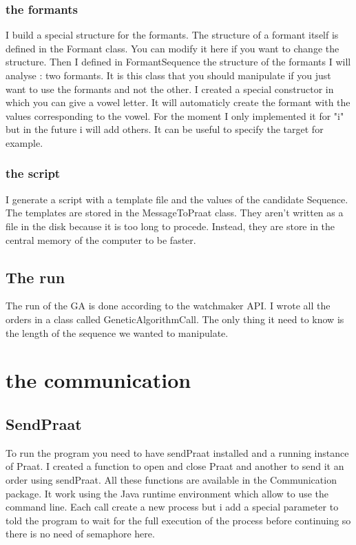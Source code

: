 \documentclass[12pt]{report}
\begin{document}
\subsection{the formants}
I build a special structure for the formants. The structure of a formant itself is defined in the Formant class. You can modify it here if you want to change the structure. Then I defined in FormantSequence the structure of the formants I will analyse : two formants. It is this class that you should manipulate if you just want to use the formants and not the other. I created a special constructor in which you can give a vowel letter. It will automaticly create the formant with the values corresponding to the vowel. For the moment I only implemented it for "i" but in the future i will add others. It can be useful to specify the target for example.

\subsection{the script}
I generate a script with a template file and the values of the candidate Sequence. The templates are stored in the MessageToPraat class. They aren't written as a file in the disk because it is too long to procede. Instead, they are store in the central memory of the computer to be faster.

\section{The run}
The run of the GA is done according to the watchmaker API. I wrote all the orders in a class called GeneticAlgorithmCall. The only thing it need to know is the length of the sequence we wanted to manipulate.

\chapter{the communication}
\section{SendPraat}
To run the program you need to have sendPraat installed and a running instance of Praat.
I created a function to open and close Praat and another to send it an order using sendPraat. All these functions are available in the Communication package. It work using the Java runtime environment which allow to use the command line. Each call create a new process but i add a special parameter to told the program to wait for the full execution of the process before continuing so there is no need of semaphore here.
\end{document}
